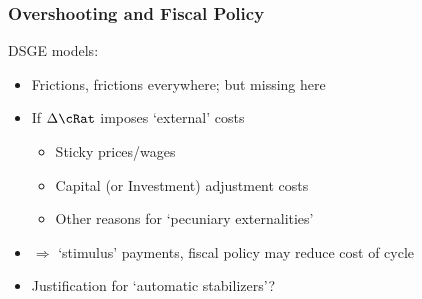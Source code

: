                                                \begin{frame}\frametitle{\bf Overshooting and Fiscal Policy}

                                                 DSGE models:
                                                 \begin{itemize}
                                                 \item Frictions, frictions everywhere; but missing here
                                                 \item If $\Delta \cRat$ imposes `external' costs
                                                   \begin{itemize}
                                                   \item Sticky prices/wages
                                                   \item Capital (or Investment) adjustment costs
                                                   \item Other reasons for `pecuniary externalities'
                                                   \end{itemize}
                                                 \item $\Rightarrow$ `stimulus' payments, fiscal policy may reduce cost of cycle
                                                 \item Justification for `automatic stabilizers'?
                                                 \end{itemize}

                                               \end{frame}
                                             
